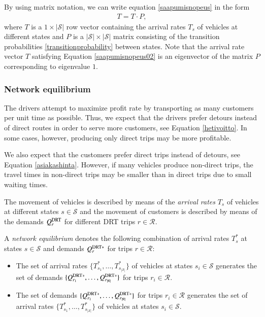 \documentclass[dissertation,draft*]{aaltoseries}
\begin{document}
By using matrix notation, we can write equation \eqref{saapumisnopeus}
in the form
\begin{align}
\label{saapumisnopeus02}
T = T \cdot P, 
\end{align}
where $T$ is a $1 \times |\mathcal{S}|$ row vector containing the arrival rates $T_s$ 
of vehicles at different states and $P$ is a $|\mathcal{S}|\times |\mathcal{S}|$ matrix
consisting of the transition probabilities \eqref{transitionprobability} between states.
Note that the arrival rate vector $T$ satisfying Equation \eqref{saapumisnopeus02} 
is an eigenvector of the matrix $P$ corresponding to eigenvalue $1$.


\subsubsection{Network equilibrium}
\label{networkequilibrium}
The drivers attempt to maximize profit rate by 
transporting as many customers per unit time as possible. Thus, we expect that the
drivers prefer detours instead of direct routes in order to serve more 
customers, see Equation \eqref{hetivoitto}.
In some cases, however, producing only direct trips may be more profitable. 

We also expect that the customers prefer direct trips instead of detours, see Equation \eqref{asiakashinta}.
However, if many vehicles produce non-direct trips, 
the travel times in non-direct trips may be smaller than in direct trips due 
to small waiting times.

The movement of vehicles is described by means of the \emph{arrival rates} $T_s$ 
of vehicles at different states $s \in \mathcal{S}$ and
the movement of customers is described by means of the demands $Q^{\rm DRT}_r$ 
for different DRT trips $r \in \mathcal{R}$. 

A \emph{network equilibrium} denotes the following combination of
arrival rates $T_s^*$ at states $s \in \mathcal{S}$ and demands $Q_r^{{\rm DRT}*}$ for trips $r \in \mathcal{R}$: 
\begin{itemize}
\item
The set of arrival rates $\{T_{s_1}^*,\ldots,T_{s_{|\mathcal{S}|}}^*\}$ of vehicles at states $s_i \in \mathcal{S}$ 
generates the set of demands $\{Q_{r_1}^{{\rm DRT}*},\ldots,Q_{r_{|\mathcal{R}|}}^{{\rm DRT}*}\}$ for trips $r_i \in \mathcal{R}$.
\item
The set of demands $\{Q_{r_1}^{{\rm DRT}*},\ldots,Q_{r_{|\mathcal{R}|}}^{{\rm DRT}*}\}$ for trips $r_i \in \mathcal{R}$
generates the set of arrival rates $\{T_{s_1}^*,\ldots,T_{s_{|\mathcal{S}|}}^*\}$ of vehicles at states $s_i \in \mathcal{S}$. 
\end{itemize}
\end{document}
